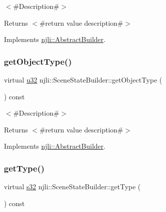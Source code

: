 $<$\#\+Description\#$>$

\begin{DoxyReturn}{Returns}
$<$\#return value description\#$>$ 
\end{DoxyReturn}


Implements \mbox{\hyperlink{classnjli_1_1_abstract_builder_a902f73ea78031b06aca183a417f3413b}{njli\+::\+Abstract\+Builder}}.

\mbox{\label{classnjli_1_1_scene_state_builder_adbb863f1a1d85cb5d8354462cb7fa5ae}} 
\subsubsection{\texorpdfstring{get\+Object\+Type()}{getObjectType()}}
{\footnotesize\ttfamily virtual \mbox{\hyperlink{_util_8h_a10e94b422ef0c20dcdec20d31a1f5049}{u32}} njli\+::\+Scene\+State\+Builder\+::get\+Object\+Type (\begin{DoxyParamCaption}{ }\end{DoxyParamCaption}) const\hspace{0.3cm}{\ttfamily [virtual]}}

$<$\#\+Description\#$>$

\begin{DoxyReturn}{Returns}
$<$\#return value description\#$>$ 
\end{DoxyReturn}


Implements \mbox{\hyperlink{classnjli_1_1_abstract_builder_a0f2d344fcf697b167f4f2b1122b5fb33}{njli\+::\+Abstract\+Builder}}.

\mbox{\label{classnjli_1_1_scene_state_builder_a6e8b777bc6877335f84bb06f0f568494}} 
\subsubsection{\texorpdfstring{get\+Type()}{getType()}}
{\footnotesize\ttfamily virtual \mbox{\hyperlink{_util_8h_aa62c75d314a0d1f37f79c4b73b2292e2}{s32}} njli\+::\+Scene\+State\+Builder\+::get\+Type (\begin{DoxyParamCaption}{ }\end{DoxyParamCaption}) const\hspace{0.3cm}{\ttfamily [virtual]}}

